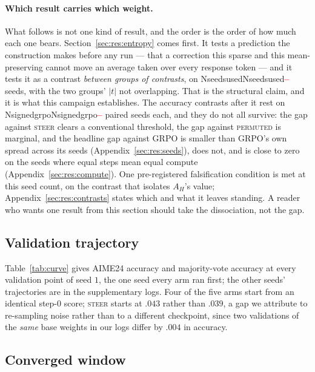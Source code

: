 \documentclass[11pt]{article}
\newcommand{\AH}{A_{H}}
\providecommand{\PENDING}{\textcolor{red}{\textbf{--}}}
\newcommand{\num}[1]{\ifcsname #1\endcsname\csname #1\endcsname\else\PENDING\fi}
\begin{document}
\paragraph{Which result carries which weight.} What follows is not one kind of
result, and the order is the order of how much each one bears.
Section~\ref{sec:res:entropy} comes first. It tests a prediction the construction
makes before any run --- that a correction this sparse and this mean-preserving
cannot move an average taken over every response token --- and it tests it as a
contrast \emph{between groups of contrasts}, on \num{Nseedsused} seeds, with
the two groups' $|t|$ not overlapping. That is the structural claim, and it is what
this campaign establishes. The accuracy contrasts after it rest on
\num{Nsignedgrpo} paired seeds each, and they do not all survive: the gap against
\textsc{steer} clears a conventional threshold, the gap against \textsc{permuted} is
marginal, and the headline gap against GRPO is smaller than GRPO's own spread across
its seeds (Appendix~\ref{sec:res:seeds}), does not, and is close to zero on the
seeds where equal steps mean equal compute (Appendix~\ref{sec:res:compute}). One pre-registered
falsification condition is met at this seed count, on the contrast that isolates
$\AH$'s value; Appendix~\ref{sec:res:contrasts} states which and what it leaves
standing. A reader who wants one result from this section should take the
dissociation, not the gap.


\subsection{Validation trajectory}
\label{sec:res:curve}

Table~\ref{tab:curve} gives AIME24 accuracy and majority-vote accuracy at every
validation point of seed $1$, the one seed every arm ran first; the other seeds'
trajectories are in the supplementary logs. Four of the five arms start from an identical
step-0 score; \textsc{steer} starts at $.043$ rather than $.039$, a gap we
attribute to re-sampling noise rather than to a different checkpoint, since two
validations of the \emph{same} base weights in our logs differ by $.004$ in
accuracy.


\subsection{Converged window}
\label{sec:res:main-app}
\end{document}
